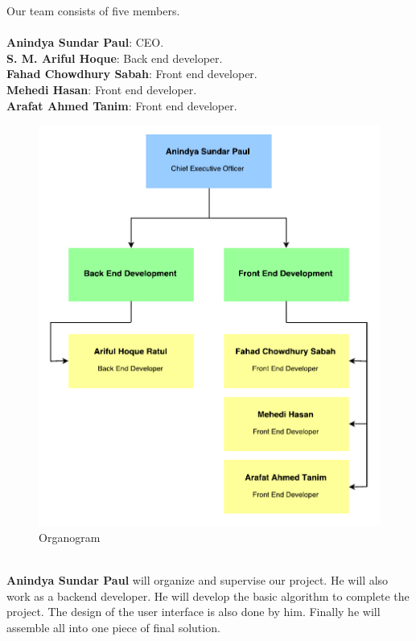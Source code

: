 \documentclass[12pt, a4paper]{article}
\begin{document}
Our team consists of five members.\\ \\
\textbf{Anindya Sundar Paul}: CEO.\\
\textbf{S. M. Ariful Hoque}: Back end developer.\\
\textbf{Fahad Chowdhury Sabah}: Front end developer.\\
\textbf{Mehedi Hasan}: Front end developer.\\
\textbf{Arafat Ahmed Tanim}: Front end developer.\\
\begin{figure}[h!]
\centering
\includegraphics[scale=0.8]{remote-pc-controller-organogram}
\caption{Organogram}
\end{figure} \\
\textbf{Anindya Sundar Paul} will organize and supervise our project. He will also work as a backend developer. He will develop the basic algorithm to complete the project. The design of the user interface is also done by him. Finally he will assemble all into one piece of final solution.\\ \\ \\
\end{document}
